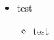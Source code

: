 \documentclass{beamer}
\begin{document}
    
\begin{frame}
    \begin{itemize}
  \item test
    \begin{itemize}
    \item test
    \end{itemize}
  \end{itemize}
\end{frame} 
    
\end{document}
